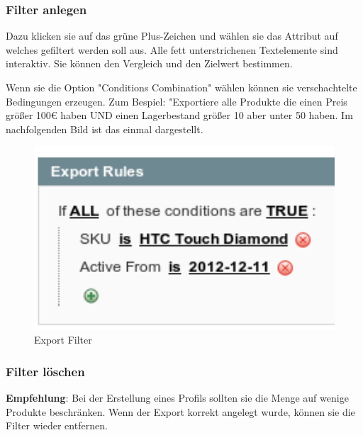 \documentclass[a4paper,12pt]{book}
\begin{document}
\subsubsection{Filter anlegen}
Dazu klicken sie auf das grüne Plus-Zeichen und wählen sie das
Attribut auf welches gefiltert werden soll aus. Alle fett
unterstrichenen Textelemente sind interaktiv. Sie können den Vergleich
und den Zielwert bestimmen.

Wenn sie die Option "Conditions Combination" wählen können sie
verschachtelte Bedingungen erzeugen. Zum Bespiel: "Exportiere alle
Produkte die einen Preis größer 100\euro{} haben UND einen Lagerbestand
größer 10 aber unter 50 haben. Im nachfolgenden Bild ist das einmal
dargestellt.

\begin{figure}
 \includegraphics[width=1\textwidth]{img/bild08.png}
  \caption{Export Filter}
  \label{figure:export_filter}
\end{figure}

\subsubsection{Filter löschen}

\textbf{Empfehlung}: Bei der Erstellung eines Profils sollten sie die Menge auf
wenige Produkte beschränken. Wenn der Export korrekt angelegt wurde,
können sie die Filter wieder entfernen.
\end{document}
